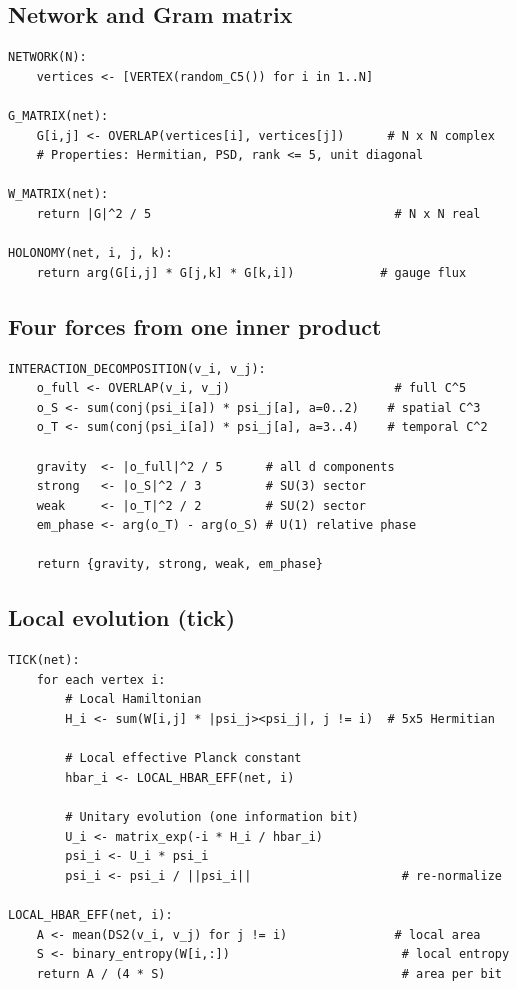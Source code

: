 \documentclass[12pt]{article}
\theoremstyle{remark}
\theoremstyle{definition}
\begin{document}
\subsection{Network and Gram matrix}

\begin{verbatim}
NETWORK(N):
    vertices <- [VERTEX(random_C5()) for i in 1..N]

G_MATRIX(net):
    G[i,j] <- OVERLAP(vertices[i], vertices[j])      # N x N complex
    # Properties: Hermitian, PSD, rank <= 5, unit diagonal

W_MATRIX(net):
    return |G|^2 / 5                                  # N x N real

HOLONOMY(net, i, j, k):
    return arg(G[i,j] * G[j,k] * G[k,i])            # gauge flux
\end{verbatim}

\subsection{Four forces from one inner product}

\begin{verbatim}
INTERACTION_DECOMPOSITION(v_i, v_j):
    o_full <- OVERLAP(v_i, v_j)                       # full C^5
    o_S <- sum(conj(psi_i[a]) * psi_j[a], a=0..2)    # spatial C^3
    o_T <- sum(conj(psi_i[a]) * psi_j[a], a=3..4)    # temporal C^2

    gravity  <- |o_full|^2 / 5      # all d components
    strong   <- |o_S|^2 / 3         # SU(3) sector
    weak     <- |o_T|^2 / 2         # SU(2) sector
    em_phase <- arg(o_T) - arg(o_S) # U(1) relative phase

    return {gravity, strong, weak, em_phase}
\end{verbatim}

\subsection{Local evolution (tick)}

\begin{verbatim}
TICK(net):
    for each vertex i:
        # Local Hamiltonian
        H_i <- sum(W[i,j] * |psi_j><psi_j|, j != i)  # 5x5 Hermitian

        # Local effective Planck constant
        hbar_i <- LOCAL_HBAR_EFF(net, i)

        # Unitary evolution (one information bit)
        U_i <- matrix_exp(-i * H_i / hbar_i)
        psi_i <- U_i * psi_i
        psi_i <- psi_i / ||psi_i||                     # re-normalize

LOCAL_HBAR_EFF(net, i):
    A <- mean(DS2(v_i, v_j) for j != i)               # local area
    S <- binary_entropy(W[i,:])                        # local entropy
    return A / (4 * S)                                 # area per bit
\end{verbatim}
\end{document}
